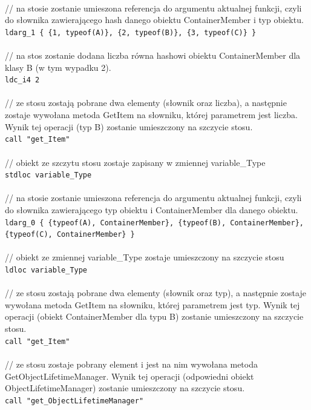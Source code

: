 \documentclass[12pt]{article}
\begin{document}
\\
// na stosie zostanie umieszona referencja do argumentu aktualnej funkcji, czyli do słownika zawierającego hash danego obiektu ContainerMember i typ obiektu.\\
\texttt{ldarg\_1 \{ \{1, typeof(A)\}, \{2, typeof(B)\}, \{3, typeof(C)\} \}}\\
\\
// na stos zostanie dodana liczba równa hashowi obiektu ContainerMember dla klasy B (w tym wypadku 2).\\
\texttt{ldc\_i4 2}\\
\\
// ze stosu zostają pobrane dwa elementy (słownik oraz liczba), a następnie zostaje wywołana metoda GetItem na słowniku, której parametrem jest liczba. Wynik tej operacji (typ B) zostanie umieszczony na szczycie stosu.\\
\texttt{call "get\_Item"}\\
\\
// obiekt ze szczytu stosu zostaje zapisany w zmiennej variable\_Type\\
\texttt{stdloc variable\_Type}\\
\\
// na stosie zostanie umieszona referencja do argumentu aktualnej funkcji, czyli do słownika zawierającego typ obiektu i ContainerMember dla danego obiektu.\\
\texttt{ldarg\_0 \{ \{typeof(A), ContainerMember\}, \{typeof(B), ContainerMember\},\\
\{typeof(C), ContainerMember\} \}}\\
\\
// obiekt ze zmiennej variable\_Type zostaje umieszczony na szczycie stosu\\
\texttt{ldloc variable\_Type}\\
\\
\newpage
// ze stosu zostają pobrane dwa elementy (słownik oraz typ), a następnie zostaje wywołana metoda GetItem na słowniku, której parametrem jest typ. Wynik tej operacji (obiekt ContainerMember dla typu B) zostanie umieszczony na szczycie stosu.\\
\texttt{call "get\_Item" }\\
\\
// ze stosu zostaje pobrany element i jest na nim wywołana metoda GetObjectLifetimeManager. Wynik tej operacji (odpowiedni obiekt ObjectLifetimeManager) zostanie umieszczony na szczycie stosu.\\
\texttt{call "get\_ObjectLifetimeManager"}\\
\end{document}
